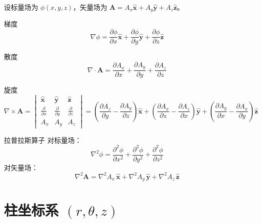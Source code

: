 \documentclass[12pt,a4paper,openany,oneside]{book}
\newcommand{\vect}[1]{\bm{#1}}
\newcommand{\unitvec}[1]{\hat{\vect{#1}}}
\newcommand{\grad}{\nabla}
\newcommand{\curl}{\nabla\times}
\newcommand{\divg}{\nabla\cdot}
\newcommand{\lap}{\nabla^2}
\begin{document}
设标量场为 $\phi(x,y,z)$，矢量场为 $\vect{A}=A_x\unitvec{x}+A_y\unitvec{y}+A_z\unitvec{z}$。

\begin{definition}{梯度}{}{}
\begin{equation}
\grad\phi = \frac{\partial \phi}{\partial x}\unitvec{x} + \frac{\partial \phi}{\partial y}\unitvec{y} + \frac{\partial \phi}{\partial z}\unitvec{z}
\end{equation}
\end{definition}

\begin{definition}{散度}{}{}
\begin{equation}
\divg\vect{A} = \frac{\partial A_x}{\partial x} + \frac{\partial A_y}{\partial y} + \frac{\partial A_z}{\partial z}
\end{equation}
\end{definition}

\begin{definition}{旋度}{}{}
\begin{equation}
\curl\vect{A} =
\begin{vmatrix}
\unitvec{x} & \unitvec{y} & \unitvec{z} \\[4pt]
\frac{\partial }{\partial x} & \frac{\partial }{\partial y} & \frac{\partial }{\partial z} \\[4pt]
A_x & A_y & A_z
\end{vmatrix}
= \left(\frac{\partial A_z}{\partial y}-\frac{\partial A_y}{\partial z}\right)\unitvec{x}
+ \left(\frac{\partial A_x}{\partial z}-\frac{\partial A_z}{\partial x}\right)\unitvec{y}
+ \left(\frac{\partial A_y}{\partial x}-\frac{\partial A_x}{\partial y}\right)\unitvec{z}
\end{equation}
\end{definition}

\begin{definition}{拉普拉斯算子}{}{}
对标量场：
\begin{equation}
\lap\phi = \frac{\partial^2 \phi}{\partial x^2} + \frac{\partial^2 \phi}{\partial y^2} + \frac{\partial^2 \phi}{\partial z^2}
\end{equation}
对矢量场：
\begin{equation}
\lap\vect{A} = \lap A_x\,\unitvec{x} + \lap A_y\,\unitvec{y} + \lap A_z\,\unitvec{z}
\end{equation}
\end{definition}


\section{柱坐标系 \texorpdfstring{$(r,\theta,z)$}{(r,θ,z)}}
\end{document}
